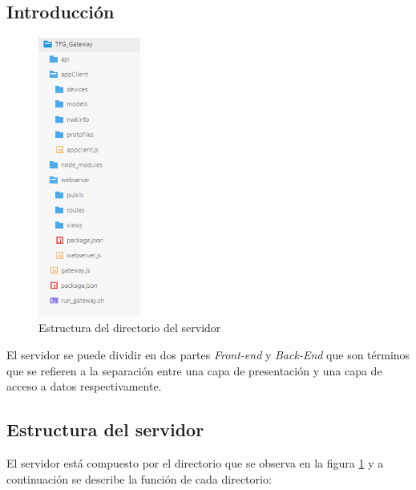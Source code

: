 
\subsection*{Introducción}
\begin{figure}
	\begin{center}
		\includegraphics[width=0.3\textwidth]{graphs/estructuraServidor.png}
	\end{center}
	\caption{Estructura del directorio del servidor}
	\label{fig:estructuraServidor}
\end{figure}

El servidor se puede dividir en dos partes \textit{Front-end} y \textit{Back-End} que son términos que se refieren a la separación entre una capa de presentación y una capa de acceso a datos respectivamente. 

\subsection*{Estructura del servidor}

El servidor está compuesto por el directorio que se observa en la figura \ref{fig:estructuraServidor} y a continuación se describe la función de cada directorio:


